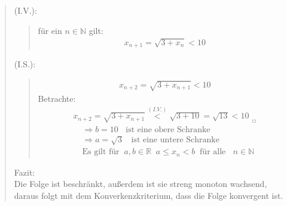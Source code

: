 \begin{quote}
	\textbullet \;\;(I.V.):\\
	\begin{quote}
		für ein $ n\in\mathbb{N} $ gilt:\\
		\begin{align*}
		x_{n+1}=\sqrt{3+x_n}<10
		\end{align*}
	\end{quote}
	\textbullet \;\;(I.S.):\\
	\begin{quote}
		\begin{align*}
		x_{n+2}=\sqrt{3+x_{n+1}}<10
		\end{align*}
		Betrachte:\\
		\begin{align*}
		x_{n+2}=\sqrt{3+x_{n+1}}\overset{(I.V.)}{<} \sqrt{3+10}=\sqrt{13}<10_{\;\;_{\Square}}
		\end{align*}
		\begin{align*}
		&\Rightarrow b=10\;\;\text{ ist eine obere Schranke}\\
		&\Rightarrow a=\sqrt{3}\;\;\text{ ist eine untere Schranke}\\
		&\text{Es gilt für}\;\;a,b \in \mathbb{R} \;\;a\leq x_n< b\;\;\text{für alle }\;\;n\in\mathbb{N}
		\end{align*}
	\end{quote}
	Fazit:\\
	Die Folge ist beschränkt, außerdem ist sie streng monoton wachsend, daraus folgt mit dem Konverkenzkriterium, dass die Folge konvergent ist.
\end{quote}


